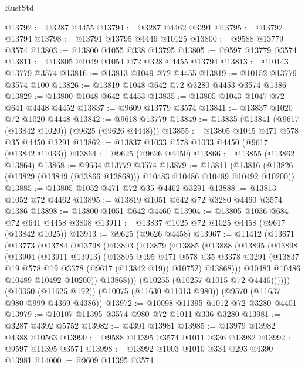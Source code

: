 \begin{lexlean}{RustStd}
\begin{coremodule}
{\begin{coremodule}
{{{{{{{{{{{{{{{{{{{{{{{{{{{{{{{{{@13792 := @3287 @4455
@13794 := @3287 @4462 @3291
@13795 := @13792 @13794
@13798 := @13791 @13795 @4446 @10125
@13800 := @9588 @13779 @3574
@13803 := @13800 @1055 @338 @13795
@13805 := @9597 @13779 @3574
@13811 := @13805 @1049 @1054 @72 @328 @4455 @13794
@13813 := @10143 @13779 @3574
@13816 := @13813 @1049 @72 @4455
@13819 := @10152 @13779 @3574 @100
@13826 := @13819 @1048 @642 @72 @3280 @4453 @3574 @1386
@13829 := @13800 @1048 @642 @4453
@13835 := @13805 @1043 @1047 @72 @641 @4448 @4452
@13837 := @9609 @13779 @3574
@13841 := @13837 @1020 @72 @1020 @4448
@13842 := @9618 @13779
@13849 := @13835 (@13841 (@9617 (@13842 @1020)) (@9625 (@9626 @4448)))
@13855 := @13805 @1045 @471 @578 @35 @4450 @3291
@13862 := @13837 @1033 @578 @1033 @4450 (@9617 (@13842 @1033))
@13864 := @9625 (@9626 @4450)
@13866 := @13855 (@13862 @13864)
@13868 := @9634 @13779 @3574
@13879 := @13811
    (@13816 (@13826 (@13829 (@13849 (@13866 @13868))) @10483 @10486 @10489 @10492 @10200))
@13885 := @13805 @1052 @471 @72 @35 @4462 @3291
@13888 := @13813 @1052 @72 @4462
@13895 := @13819 @1051 @642 @72 @3280 @4460 @3574 @1386
@13898 := @13800 @1051 @642 @4460
@13904 := @13805 @1036 @684 @72 @641 @4458 @3808
@13911 := @13837 @1025 @72 @1025 @4458 (@9617 (@13842 @1025))
@13913 := @9625 (@9626 @4458)
@13967 := @11412
    (@13671
      (@13773
        (@13784
          (@13798
            (@13803
              (@13879
                (@13885
                  (@13888
                    (@13895
                      (@13898
                        (@13904
                          (@13911 @13913)
                          (@13805
                            @495
                            @471
                            @578
                            @35
                            @3378
                            @3291
                            (@13837 @19 @578 @19 @3378 (@9617 (@13842 @19)) @10752)
                            @13868)))
                      @10483
                      @10486
                      @10489
                      @10492
                      @10200))
                  @13868)))
            (@10255 (@10257 @1015 @72 @4446))))))
    (@10050 (@11625 @192))
    (@10075 (@11630 @11013 @980))
    (@9570 (@11637 @980 @999 @4369 @4386))
@13972 := @10098 @11395 @1012 @72 @3280 @4401
@13979 := @10107 @11395 @3574 @980 @72 @1011 @336 @3280
@13981 := @3287 @4392 @5752
@13982 := @4391 @13981
@13985 := @13979 @13982 @4388 @10563
@13990 := @9588 @11395 @3574 @1011 @336 @13982
@13992 := @9597 @11395 @3574
@13998 := @13992 @1003 @1010 @334 @293 @4390 @13981
@14000 := @9609 @11395 @3574
}}}}}}}}}}}}}}}}}}}}}}}}}}}}}}}}}
\end{coremodule}}
\end{coremodule}
\end{lexlean}
